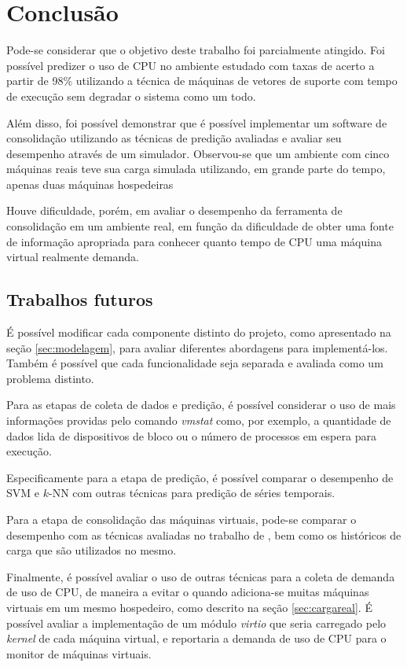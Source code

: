 \chapter{Conclusão}

Pode-se considerar que o objetivo deste trabalho foi parcialmente atingido. Foi
possível predizer o uso de CPU no ambiente estudado com taxas de acerto a
partir de 98\% utilizando a técnica de máquinas de vetores de suporte com tempo
de execução sem degradar o sistema como um todo.

Além disso, foi possível demonstrar que é possível implementar um software de
consolidação utilizando as técnicas de predição avaliadas e avaliar seu
desempenho através de um simulador. Observou-se que um ambiente com cinco
máquinas reais teve sua carga simulada utilizando, em grande parte do tempo,
apenas duas máquinas hospedeiras

Houve dificuldade, porém, em avaliar o desempenho da ferramenta de consolidação
em um ambiente real, em função da dificuldade de obter uma fonte de informação
apropriada para conhecer quanto tempo de CPU uma máquina virtual realmente
demanda.

\section{Trabalhos futuros}

É possível modificar cada componente distinto do projeto, como apresentado
na seção \ref{sec:modelagem}, para avaliar diferentes abordagens para
implementá-los. Também é possível que cada funcionalidade seja separada e
avaliada como um problema distinto.

Para as etapas de coleta de dados e predição, é possível considerar o uso
de mais informações providas pelo comando \emph{vmstat} como, por exemplo,
a quantidade de dados lida de dispositivos de bloco ou o número de
processos em espera para execução.

Especificamente para a etapa de predição, é possível comparar o desempenho
de SVM e $k$-NN com outras técnicas para predição de séries temporais.

Para a etapa de consolidação das máquinas virtuais, pode-se comparar o
desempenho com as técnicas avaliadas no trabalho de
, bem como os históricos de carga que são
utilizados no mesmo.

Finalmente, é possível avaliar o uso de outras técnicas para a coleta de
demanda de uso de CPU, de maneira a evitar o quando adiciona-se muitas
máquinas virtuais em um mesmo hospedeiro, como descrito na seção
\ref{sec:cargareal}. É possível avaliar a implementação de um módulo
\emph{virtio} que seria carregado pelo \emph{kernel} de cada máquina
virtual, e reportaria a demanda de uso de CPU para o monitor de máquinas
virtuais.

